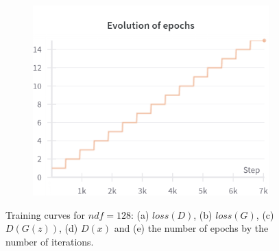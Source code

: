 \begin{figure}[H]
    \begin{subfigure}{0.45\textwidth}
        \centering
        \includegraphics[width=0.95\linewidth]{ndf/128/epochs.png}
        \caption{}
        \label{subfig:ndf/128/epochs}
    \end{subfigure}%

    \caption{Training curves for $ndf=128$: (a) $loss(D)$, (b) $loss(G)$, (c) $D(G(z))$, (d) $D(x)$ and (e) the number of epochs by the number of iterations.}
    \label{fig:ndf/128_losses}
\end{figure}

